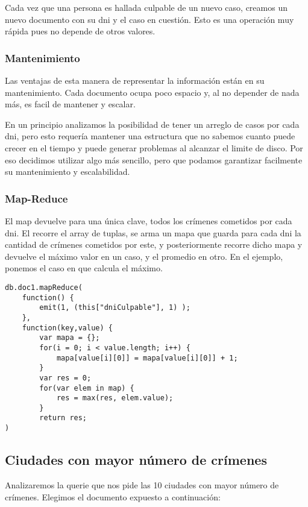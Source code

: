 \documentclass[11pt, a4paper]{article}
\begin{document}
Cada vez que una persona es hallada culpable de un nuevo caso, creamos un nuevo documento con su dni y el caso en cuesti\'on. Esto es una operaci\'on muy r\'apida pues no depende de otros valores.

\subsubsection{Mantenimiento}

Las ventajas de esta manera de representar la informaci\'on est\'an en su mantenimiento. Cada documento ocupa poco espacio y, al no depender de nada m\'as, es facil de mantener y escalar. \

En un principio analizamos la posibilidad de tener un arreglo de casos por cada dni, pero esto requer\'ia mantener una estructura que no sabemos cuanto puede crecer en el tiempo y puede generar problemas al alcanzar el limite de disco. Por eso decidimos utilizar algo m\'as sencillo, pero que podamos garantizar facilmente su mantenimiento y escalabilidad.

\subsubsection{Map-Reduce}

El map devuelve para una única clave, todos los crímenes cometidos por cada dni. El recorre el array de tuplas, se arma un mapa que guarda para cada dni la cantidad de crímenes cometidos por este, y posteriormente recorre dicho mapa y devuelve el máximo valor en un caso, y el promedio en otro. En el ejemplo, ponemos el caso en que calcula el máximo.

\begin{lstlisting}
db.doc1.mapReduce(
    function() {
        emit(1, (this["dniCulpable"], 1) );
    },
    function(key,value) { 
        var mapa = {};
        for(i = 0; i < value.length; i++) {
            mapa[value[i][0]] = mapa[value[i][0]] + 1;
        }
        var res = 0;
        for(var elem in map) {
        	res = max(res, elem.value);
        }
        return res;
)
\end{lstlisting}

\subsection{Ciudades con mayor n\'umero de cr\'imenes}

Analizaremos la querie que nos pide las 10 ciudades con mayor n\'umero de crímenes. Elegimos el documento expuesto a continuación:\
\end{document}
